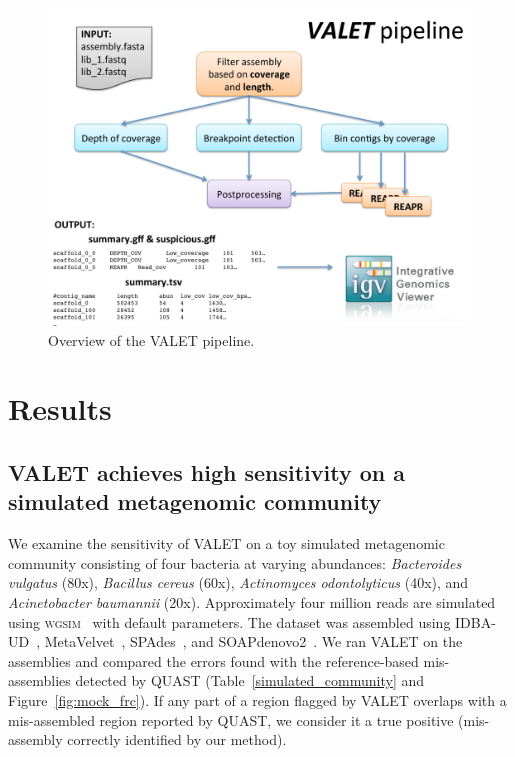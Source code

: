 \documentclass{bioinfo}
\begin{document}
\begin{figure}[tb!]
\begin{center}
\includegraphics[width=4.86in]{figures/valet_pipeline}
\end{center}
\caption[Overview of the VALET pipeline]{Overview of the VALET pipeline.}
\label{fig:valet_pipeline}
\end{figure}

\section{Results}

\subsection{VALET achieves high sensitivity on a simulated metagenomic community}

We examine the sensitivity of VALET on a toy simulated metagenomic community consisting of four bacteria at varying abundances: \emph{Bacteroides vulgatus} (80x), \emph{Bacillus cereus} (60x), \emph{Actinomyces odontolyticus} (40x), and \emph{Acinetobacter baumannii} (20x).
Approximately four million reads are simulated using \textsc{wgsim}~\citep{li2013wgsim} with default parameters.
The dataset was assembled using IDBA-UD~\citep{peng2012idba}, MetaVelvet~\citep{namiki2012metavelvet}, SPAdes~\citep{bankevich2012spades}, and SOAPdenovo2~\citep{luo2012soapdenovo2}.
We ran VALET on the assemblies and compared the errors found with the reference-based mis-assemblies detected by QUAST (Table~\ref{simulated_community} and Figure~\ref{fig:mock_frc}).
If any part of a region flagged by VALET overlaps with a mis-assembled region reported by QUAST, we consider it a true positive (mis-assembly correctly identified by our method).
\end{document}
